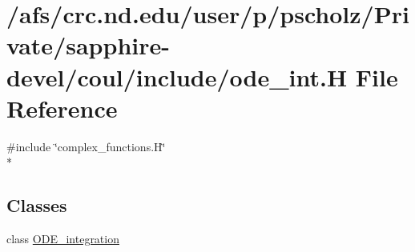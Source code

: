 \hypertarget{ode__int_8H}{\section{/afs/crc.nd.\-edu/user/p/pscholz/\-Private/sapphire-\/devel/coul/include/ode\-\_\-int.H File Reference}
\label{ode__int_8H}
}
{\ttfamily \#include \char`\"{}complex\-\_\-functions.\-H\char`\"{}}\\*
\subsection*{Classes}
\begin{DoxyCompactItemize}
\item 
class \hyperlink{classODE__integration}{O\-D\-E\-\_\-integration}
\end{DoxyCompactItemize}
